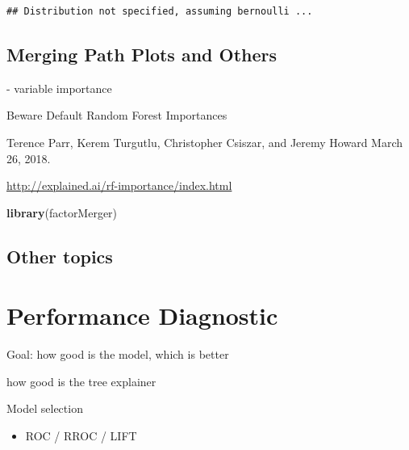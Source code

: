 \documentclass[12pt,]{krantz}
\newenvironment{Shaded}{\begin{snugshade}}{\end{snugshade}}
\newcommand{\KeywordTok}[1]{\textcolor[rgb]{0.13,0.29,0.53}{\textbf{#1}}}
\newcommand{\NormalTok}[1]{#1}
\providecommand{\tightlist}{%
  \setlength{\itemsep}{0pt}\setlength{\parskip}{0pt}}
\theoremstyle{definition}
\theoremstyle{definition}
\theoremstyle{definition}
\theoremstyle{remark}
\begin{document}
\begin{verbatim}
## Distribution not specified, assuming bernoulli ...
\end{verbatim}

\hypertarget{factorMerger}{%
\subsection{Merging Path Plots and Others}\label{factorMerger}}

\citep{demsar2018}

\citep{RJ2017016} \citep{MAGIX}

\citep{R-factorMerger}

\citep{Strobl2007} \citep{Strobl2008} - variable importance

\citep{2018arXiv180101489F}

Beware Default Random Forest Importances

Terence Parr, Kerem Turgutlu, Christopher Csiszar, and Jeremy Howard
March 26, 2018.

\url{http://explained.ai/rf-importance/index.html}

\begin{Shaded}
\begin{Highlighting}[]
\KeywordTok{library}\NormalTok{(factorMerger)}
\end{Highlighting}
\end{Shaded}

\hypertarget{other-topics}{%
\subsection{Other topics}\label{other-topics}}

\citep{R-randomForestExplainer} \citep{R-ICEbox} \citep{R-ALEPlot}

\citep{R-modelDown}

\hypertarget{performanceDiagnostic}{%
\section{Performance Diagnostic}\label{performanceDiagnostic}}

Goal: how good is the model, which is better

\citep{Piltaver2016} how good is the tree explainer

Model selection

\begin{itemize}
\tightlist
\item
  ROC / RROC / LIFT
\end{itemize}
\end{document}
